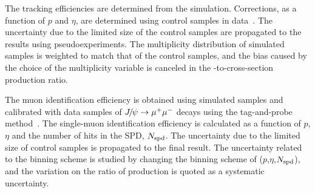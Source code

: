 \documentclass[12pt,a4paper]{article}
\begin{document}
The tracking efficiencies are determined from the simulation. Corrections, as a function of $p$ and $\eta$, are determined using \jpsi control samples in data~\cite{DeCian:1402577}. The uncertainty due to the limited size of the control samples are propagated to the results using pseudoexperiments. The multiplicity distribution of simulated samples is weighted to match that of the control samples, and the bias caused by the choice of the multiplicity variable is canceled in the \psitwos-to-\jpsi cross-section production ratio.

The muon identification efficiency is obtained using simulated samples and calibrated with data samples of ${{J\mskip -3mu/\mskip -2mu\psi}}\rightarrow \mu^+\mu^-$ decays using the tag-and-probe method~\cite{Archilli:2013npa}.  The single-muon identification efficiency is calculated as a function of $p$, $\eta$ and the number of hits in the SPD, $N_{\rm spd}$. The uncertainty due to the limited size of control samples is propagated to the final result. The uncertainty related to the binning scheme is studied by changing the binning scheme of ($p$,$\eta$,$N_{\rm spd}$), and the variation on the ratio of production is quoted as a systematic uncertainty.
\end{document}
